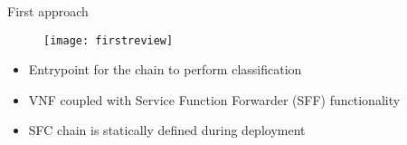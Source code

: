 \begin{frame}{First approach}

  \vspace{-0.5cm}

  \begin{figure}
    \centering
    \texttt{[image: firstreview]}
  \end{figure}

  \vspace{0.2cm}

  \begin{itemize}
    \item Entrypoint for the chain to perform classification
    \item VNF coupled with Service Function Forwarder (SFF) functionality
    \item SFC chain is statically defined during deployment
  \end{itemize}

\end{frame}